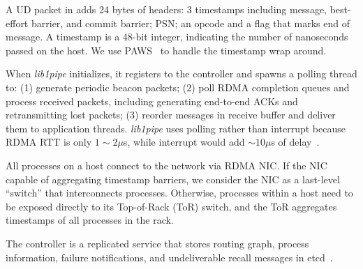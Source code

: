 A UD packet in \sys{} adds 24 bytes of headers: 3 timestamps including message, best-effort barrier, and commit barrier; PSN; an opcode and a flag that marks end of message.
A timestamp is a 48-bit integer, indicating the number of nanoseconds passed on the host. %
We use PAWS~\cite{jacobson1992tcp} to handle the timestamp wrap around.



When \textit{lib1pipe} initializes, it registers to the controller and spawns a polling thread to: (1) generate periodic beacon packets; (2) poll RDMA completion queues and process received packets, including generating end-to-end ACKs and retransmitting lost packets; (3) reorder messages in receive buffer and deliver them to application threads.
\textit{lib1pipe} uses polling rather than interrupt because RDMA RTT is only $1\sim2 \mu$s, while interrupt would add $\sim10 \mu$s of delay~\cite{yang2012poll}.

All processes on a host connect to the network via RDMA NIC. If the NIC capable of aggregating timestamp barriers, we consider the NIC as a last-level ``switch'' that interconnects processes. Otherwise, processes within a host need to be exposed directly to its Top-of-Rack (ToR) switch, and the ToR aggregates timestamps of all processes in the rack.

The controller is a replicated service that stores routing graph, process information, failure notifications, and undeliverable recall messages in etcd~\cite{etcd}.




